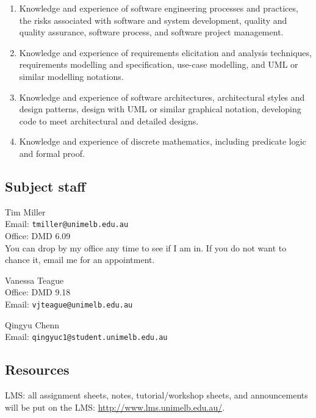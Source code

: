 \begin{enumerate}

 \item Knowledge and experience of software engineering processes and    practices, the risks associated with software and system    development, quality and quality assurance, software process, and    software project management.

  \item Knowledge and experience of requirements elicitation and     analysis techniques, requirements modelling and specification,     use-case modelling, and UML or similar modelling notations.

  \item Knowledge and experience of software architectures,     architectural styles and design patterns, design with UML or     similar graphical notation, developing code to meet architectural     and detailed designs.

  \item Knowledge and experience of discrete mathematics, including     predicate logic and formal proof.

\end{enumerate}


\subsection*{Subject staff}

Tim Miller\\
Email: {\tt tmiller@unimelb.edu.au}\\
Office: DMD 6.09\\
You can drop by my office any time to see if I am in. If you do not want to chance it, email me for an appointment.

Vanessa Teague\\
Office: DMD 9.18\\ 
Email: \texttt{vjteague@unimelb.edu.au}

 Qingyu Chenn\\
 Email: \texttt{qingyuc1@student.unimelb.edu.au}

\subsection*{Resources}

LMS: all assignment sheets, notes, tutorial/workshop sheets, and announcements will be put on the LMS: \url{http://www.lms.unimelb.edu.au/}.


